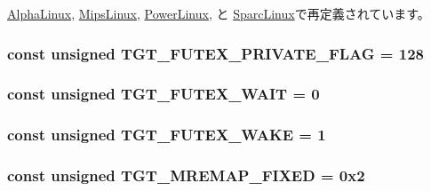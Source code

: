 \hyperlink{classAlphaLinux_a1def346ff527c8efccfd52463f3b5dc1}{AlphaLinux}, \hyperlink{classMipsLinux_a1def346ff527c8efccfd52463f3b5dc1}{MipsLinux}, \hyperlink{classPowerLinux_a1def346ff527c8efccfd52463f3b5dc1}{PowerLinux}, と \hyperlink{classSparcLinux_a1def346ff527c8efccfd52463f3b5dc1}{SparcLinux}で再定義されています。\hypertarget{classLinux_aac48b0673ec47bd265f960a40df8174a}{
\subsubsection[{TGT\_\-FUTEX\_\-PRIVATE\_\-FLAG}]{\setlength{\rightskip}{0pt plus 5cm}const unsigned {\bf TGT\_\-FUTEX\_\-PRIVATE\_\-FLAG} = 128}}
\label{classLinux_aac48b0673ec47bd265f960a40df8174a}
\hypertarget{classLinux_a50b3e4a3042049bc573124af60355eb6}{
\subsubsection[{TGT\_\-FUTEX\_\-WAIT}]{\setlength{\rightskip}{0pt plus 5cm}const unsigned {\bf TGT\_\-FUTEX\_\-WAIT} = 0}}
\label{classLinux_a50b3e4a3042049bc573124af60355eb6}
\hypertarget{classLinux_adc16305e4b504b1250c0684ac15f529d}{
\subsubsection[{TGT\_\-FUTEX\_\-WAKE}]{\setlength{\rightskip}{0pt plus 5cm}const unsigned {\bf TGT\_\-FUTEX\_\-WAKE} = 1}}
\label{classLinux_adc16305e4b504b1250c0684ac15f529d}
\hypertarget{classLinux_aebbe098e8d7b38f0b58663068ebb2215}{
\subsubsection[{TGT\_\-MREMAP\_\-FIXED}]{\setlength{\rightskip}{0pt plus 5cm}const unsigned {\bf TGT\_\-MREMAP\_\-FIXED} = 0x2}}
